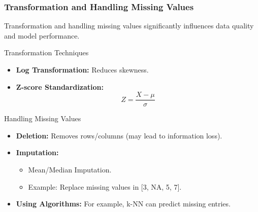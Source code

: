 \documentclass[aspectratio=169]{beamer}
\begin{document}
\begin{frame}[fragile]
    \frametitle{Transformation and Handling Missing Values}
    Transformation and handling missing values significantly influences data quality and model performance.

    \begin{block}{Transformation Techniques}
        \begin{itemize}
            \item \textbf{Log Transformation:} Reduces skewness.
            \item \textbf{Z-score Standardization:}
            \begin{equation}
            Z = \frac{X - \mu}{\sigma}
            \end{equation}
        \end{itemize}
    \end{block}

    \begin{block}{Handling Missing Values}
        \begin{itemize}
            \item \textbf{Deletion:} Removes rows/columns (may lead to information loss).
            \item \textbf{Imputation:}
            \begin{itemize}
                \item Mean/Median Imputation.
                \item Example: Replace missing values in [3, NA, 5, 7].
            \end{itemize}
            \item \textbf{Using Algorithms:} For example, k-NN can predict missing entries.
        \end{itemize}
    \end{block}
\end{frame}
\end{document}
